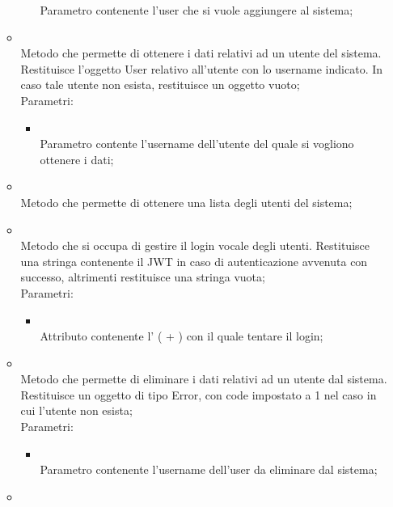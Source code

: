 \begin{itemize}
\begin{itemize}
\begin{itemize}
			Parametro contenente l'user che si vuole aggiungere al sistema;
		\end{itemize}
		\item[]  \\
		Metodo che permette di ottenere i dati relativi ad un utente del sistema. Restituisce l'oggetto User relativo all'utente con lo username indicato. In caso tale utente non esista, restituisce un oggetto vuoto;\\
		Parametri:
		\begin{itemize}
			\item {} \\
			Parametro contente l'username dell'utente del quale si vogliono ottenere i dati;
		\end{itemize}
		\item[]  \\
		Metodo che permette di ottenere una lista degli utenti del sistema;\\
		\item[]  \\
		Metodo che si occupa di gestire il login vocale degli utenti. Restituisce una stringa contenente il JWT in caso di autenticazione avvenuta con successo, altrimenti restituisce una stringa vuota;\\
		Parametri:
		\begin{itemize}
			\item {} \\
			Attributo contenente l' ( + ) con il quale tentare il login;
		\end{itemize}
		\item[]  \\
		Metodo che permette di eliminare i dati relativi ad un utente dal sistema. Restituisce un oggetto di tipo Error, con code impostato a 1 nel caso in cui l'utente non esista;\\
		Parametri:
		\begin{itemize}
			\item {} \\
			Parametro contenente l'username dell'user da eliminare dal sistema;
		\end{itemize}
		\item[]  \\

\end{itemize}
\end{itemize}
